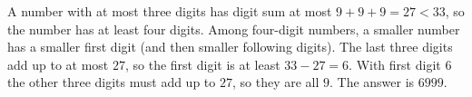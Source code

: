 A number with at most three digits has digit sum at most $9+9+9=27<33$, so the number has at least four digits. Among four-digit numbers, a smaller number has a smaller first digit (and then smaller following digits). The last three digits add up to at most $27$, so the first digit is at least $33-27=6$. With first digit $6$ the other three digits must add up to $27$, so they are all $9$. The answer is $\boxed{6999}$.
